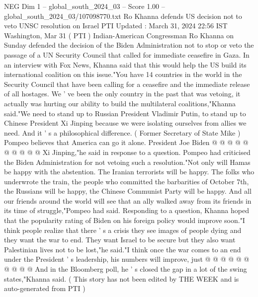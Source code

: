 \begin{textsample}{NEG Dim 1 – global\_south\_2024\_03 – Score 1.00 – global\_south\_2024\_03/107098770.txt}  \label{ex:f1_neg_429}
Ro Khanna defends US decision not to veto UNSC resolution on Israel PTI Updated : March 31, 2024 22:56 IST Washington, Mar 31 ( PTI ) Indian-American Congressman Ro Khanna on Sunday defended the decision of the Biden Administration not to stop or veto the passage of a UN Security Council that called for immediate ceasefire in Gaza.
In an interview with Fox News, Khanna said that this would help the US build its international coalition on this issue."You have 14 countries in the world in the Security Council that have been calling for a ceasefire and the immediate release of all hostages.
We ' ve been the only country in the past that was vetoing, it actually was hurting our ability to build the multilateral coalitions,"Khanna said."We need to stand up to Russian President Vladimir Putin, to stand up to Chinese President Xi Jinping because we were isolating ourselves from allies we need.
And it ' s a philosophical difference. ( Former Secretary of State Mike ) Pompeo believes that America can go it alone.
President Joe Biden @ @ @ @ @ @ @ @ @ @ Xi Jinping,"he said in response to a question.
Pompeo had criticised the Biden Administration for not vetoing such a resolution."Not only will Hamas be happy with the abstention.
The Iranian terrorists will be happy.
The folks who underwrote the train, the people who committed the barbarities of October 7th, the Russians will be happy, the Chinese Communist Party will be happy.
And all our friends around the world will see that an ally walked away from its friends in its time of struggle,"Pompeo had said.
Responding to a question, Khanna hoped that the popularity rating of Biden on his foreign policy would improve soon."I think people realize that there ' s a crisis they see images of people dying and they want the war to end.
They want Israel to be secure but they also want Palestinian lives not to be lost,"he said."I think once the war comes to an end under the President ' s leadership, his numbers will improve, just @ @ @ @ @ @ @ @ @ @ And in the Bloomberg poll, he ' s closed the gap in a lot of the swing states,"Khanna said. ( This story has not been edited by THE WEEK and is auto-generated from PTI )

\end{textsample}
